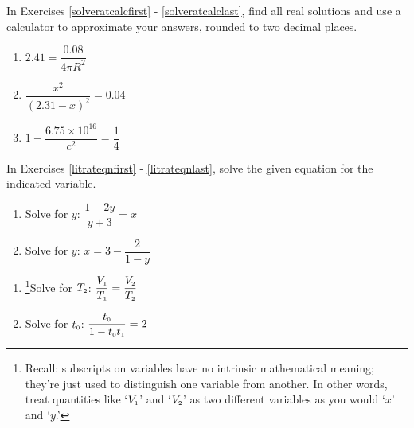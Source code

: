 In Exercises \ref{solveratcalcfirst} - \ref{solveratcalclast}, find all real solutions and use a calculator to approximate your answers, rounded to two decimal places.


\begin{multicols}{3}
\begin{enumerate}
\setcounter{enumi}{\value{HW}}


\item $2.41 = \dfrac{0.08}{4 \pi R^2}$ \label{solveratcalcfirst}
\item $\dfrac{x^2}{(2.31 -x)^2} = 0.04$
\item $1 - \dfrac{6.75 \times 10^{16}}{c^2} = \dfrac{1}{4}$ \label{solveratcalclast}

\setcounter{HW}{\value{enumi}}
\end{enumerate}
\end{multicols}



In Exercises \ref{litrateqnfirst} - \ref{litrateqnlast}, solve the given equation for the indicated variable.

\begin{multicols}{2}
\begin{enumerate}
\setcounter{enumi}{\value{HW}}


\item Solve for $y$:  $\dfrac{1-2y}{y+3} = x$ \label{litrateqnfirst}

\item Solve for $y$: $x = 3 - \dfrac{2}{1-y}$ 

\setcounter{HW}{\value{enumi}}
\end{enumerate}
\end{multicols}



\begin{multicols}{2}
\begin{enumerate}
\setcounter{enumi}{\value{HW}}

\item\hspace{-0.1in}\footnote{Recall: subscripts on variables have no intrinsic mathematical meaning; they're just used to distinguish one variable from another.  In other words, treat quantities like `$V_{\text{\tiny $1$}}$' and `$V_{\text{\tiny $2$}}$'  as two different variables as you would `$x$' and `$y$.'}Solve for $T_{\text{\tiny $2$}}$:  $\dfrac{V_{\text{\tiny $1$}}}{T_{\text{\tiny $1$}}} = \dfrac{V_{\text{\tiny $2$}}}{T_{\text{\tiny $2$}}}$


\item  Solve for $t_{\text{\tiny $0$}}$:  $\dfrac{t_{\text{\tiny $0$}}}{1-t_{\text{\tiny $0$}}t_{\text{\tiny $1$}}} = 2$ 

\setcounter{HW}{\value{enumi}}
\end{enumerate}
\end{multicols}

